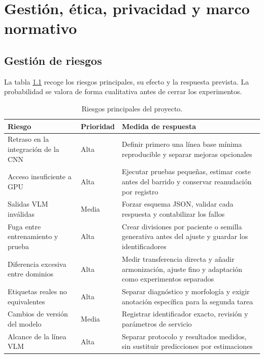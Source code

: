 \chapter{Gestión, ética, privacidad y marco normativo}
\label{chap:gestion_etica}

\section{Gestión de riesgos}

La tabla \ref{tab:riesgos} recoge los riesgos principales, su efecto y la respuesta prevista. La probabilidad se valora de forma cualitativa antes de cerrar los experimentos.

\begin{table}[H]
  \centering
  \small
  \begin{tabularx}{\textwidth}{p{3.0cm}p{1.7cm}X}
    \toprule
    Riesgo & Prioridad & Medida de respuesta \\
    \midrule
    Retraso en la integración de la CNN & Alta & Definir primero una línea base mínima reproducible y separar mejoras opcionales \\
    Acceso insuficiente a GPU & Alta & Ejecutar pruebas pequeñas, estimar coste antes del barrido y conservar reanudación por registro \\
    Salidas VLM inválidas & Media & Forzar esquema JSON, validar cada respuesta y contabilizar los fallos \\
    Fuga entre entrenamiento y prueba & Alta & Crear divisiones por paciente o semilla generativa antes del ajuste y guardar los identificadores \\
    Diferencia excesiva entre dominios & Alta & Medir transferencia directa y añadir armonización, ajuste fino y adaptación como experimentos separados \\
    Etiquetas reales no equivalentes & Alta & Separar diagnóstico y morfología y exigir anotación específica para la segunda tarea \\
    Cambios de versión del modelo & Media & Registrar identificador exacto, revisión y parámetros de servicio \\
    Alcance de la línea VLM & Alta & Separar protocolo y resultados medidos, sin sustituir predicciones por estimaciones \\
    \bottomrule
  \end{tabularx}
  \caption{Riesgos principales del proyecto.}
  \label{tab:riesgos}
\end{table}

